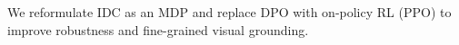 We reformulate IDC as an MDP and replace DPO with on-policy RL (PPO) to improve robustness and fine-grained visual grounding.






